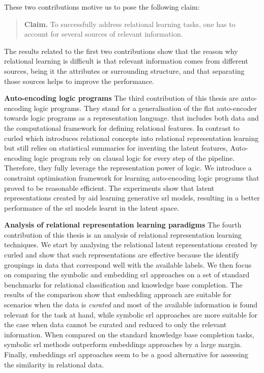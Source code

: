 These two contributions motive us to pose the following claim:

\begin{quote}
	\textbf{Claim.} To successfully address relational learning tasks, one has to account for several sources of relevant information.

\end{quote}


The results related to the first two contributions show that the reason why relational learning is difficult is that relevant information comes from different sources, being it the attributes or surrounding structure, and that separating those sources helps to improve the performance.




\textbf{Auto-encoding logic programs}
The third contribution of this thesis are auto-encoding logic programs.
They stand for a generalisation of the flat auto-encoder towards logic programs as a representation language.
that includes both data and the computational framework for defining relational features.
In contrast to \gls{curled} which introduces relational concepts into relational representation learning but still relies on statistical summaries for inventing the latent features, Auto-encoding logic program rely on clausal logic for every step of the pipeline.
Therefore, they fully leverage the representation power of logic.
We introduce a constraint optimisation framework for learning auto-encoding logic programs that proved to be reasonable efficient.
The experiments show that latent representations created by \alp{} aid learning generative \gls{srl} models, resulting in a better performance of the \gls{srl} models learnt in the latent space.







\textbf{Analysis of relational representation learning paradigms}
The fourth contribution of this thesis is an analysis of relational representation learning techniques.
We start by analysing the relational latent representations created by \gls{curled} and show that such representations are effective because the identify groupings in data that correspond well with the available labels.
We then focus on comparing the symbolic and embedding \gls{srl} approaches on a set of standard benchmarks for relational classification and knowledge base completion.
The results of the comparison show that embedding approach are suitable for scenarios when the data is \textit{curated} and most of the available information is found relevant for the task at hand, while symbolic \gls{srl} approaches are more suitable for the case when data cannot be curated and reduced to only the relevant information.
When compared on the standard knowledge base completion tasks, symbolic \gls{srl} methods outperform embeddings approaches by a large margin.
Finally, embeddings \gls{srl} approaches seem to be a good alternative for assessing the similarity in relational data.



